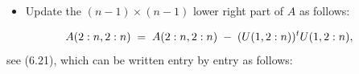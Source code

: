 %

\begin{center}
\end{center}

\begin{itemize}
\item Update the $(n-1) \times (n-1)$ lower right part of $A$ as follows:
\end{itemize}
\begin{equation}
A(2:n,2:n) \;=\; A(2:n,2:n) \;-\; (U(1,2:n))^{t} U(1,2:n),
\end{equation}
see (6.21), which can be written entry by entry as follows:

\begin{center}
\end{center}

